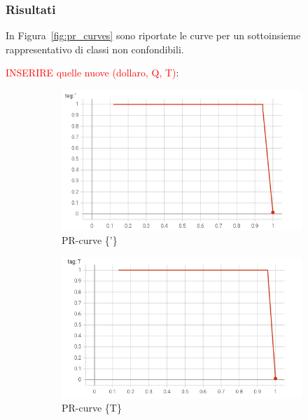 \subsubsection*{Risultati}
In Figura~\ref{fig:pr_curves} sono riportate le curve per un sottoinsieme rappresentativo di classi non confondibili.

\textcolor{red}{INSERIRE quelle nuove (dollaro, Q, T)}:
\begin{figure}[htbp]
    \centering
    \begin{subfigure}[t]{0.32\textwidth}
        \centering
        \includegraphics[width=\textwidth]{images/pr_curve1.png}
        \caption{PR-curve \{'\}}
    \end{subfigure}
    \begin{subfigure}[t]{0.32\textwidth}
        \centering
        \includegraphics[width=\textwidth]{images/pr_curve2.png}
        \caption{PR-curve \{T\}}
    \end{subfigure}
    \begin{subfigure}[t]{0.32\textwidth}
        \centering

\end{subfigure}
\end{figure}
